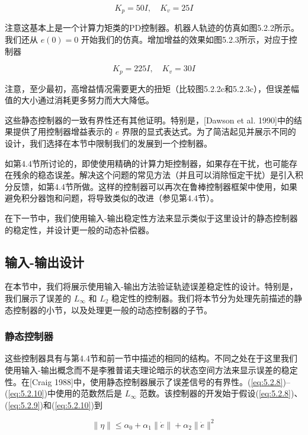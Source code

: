 \documentclass[UTF8,12pt,a4paper]{ctexart}
\begin{document}
\begin{example}
\begin{equation}
K_p = 50I, \quad K_v = 25I
\end{equation}

注意这基本上是一个计算力矩类的PD控制器。机器人轨迹的仿真如图5.2.2所示。我们还从 $e(0) = 0$ 开始我们的仿真。增加增益的效果如图5.2.3所示，对应于控制器

\begin{equation}
K_p = 225I, \quad K_v = 30I
\end{equation}

注意，至少最初，高增益情况需要更大的扭矩（比较图5.2.2c和5.2.3c），但误差幅值的大小通过消耗更多努力而大大降低。
\end{example}

这些静态控制器的一致有界性还有其他证明。特别是，[Dawson et al. 1990]中的结果提供了用控制器增益表示的 $e$ 界限的显式表达式。为了简洁起见并展示不同的设计，我们选择在本节中限制我们的发展到一个控制器。

如第4.4节所讨论的，即使使用精确的计算力矩控制器，如果存在干扰，也可能存在残余的稳态误差。解决这个问题的常见方法（并且可以消除恒定干扰）是引入积分反馈，如第4.4节所做。这样的控制器可以再次在鲁棒控制器框架中使用，如果避免积分器饱和问题，将导致类似的改进（参见第4.4节）。

在下一节中，我们使用输入-输出稳定性方法来显示类似于这里设计的静态控制器的稳定性，并设计更一般的动态补偿器。

\subsection{输入-输出设计}

在本节中，我们将展示使用输入-输出方法验证轨迹误差稳定性的设计。特别是，我们展示了误差的 $L_\infty$ 和 $L_2$ 稳定性的控制器。我们将本节分为处理先前描述的静态控制器的小节，以及处理更一般的动态控制器的子节。

\subsubsection{静态控制器}

这些控制器具有与第4.4节和前一节中描述的相同的结构。不同之处在于这里我们使用输入-输出概念而不是李雅普诺夫理论暗示的状态空间方法来显示误差的稳定性。在[Craig 1988]中，使用静态控制器展示了误差信号的有界性。(\ref{eq:5.2.8})--(\ref{eq:5.2.10})中使用的范数然后是 $L_\infty$ 范数。该控制器的开发始于假设(\ref{eq:5.2.8})、(\ref{eq:5.2.9})和(\ref{eq:5.2.10})到

\begin{equation}\label{eq:5.2.20}
\|\eta\| \leq \alpha_0 + \alpha_1\|\dot{e}\| + \alpha_2\|\dot{e}\|^2
\end{equation}
\end{document}
